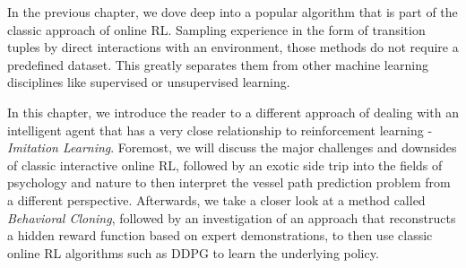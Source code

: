 In the previous chapter, we dove deep into a popular algorithm that is part of the classic approach of online RL. Sampling experience in the form of transition tuples by direct interactions with an environment, those methods do not require a predefined dataset. This greatly separates them from other machine learning disciplines like supervised or unsupervised learning.
\par 
In this chapter, we introduce the reader to a different approach of dealing with an intelligent agent that has a very close relationship to reinforcement learning - \textit{Imitation Learning}. Foremost, we will discuss the major challenges and downsides of classic interactive online RL, followed by an exotic side trip into the fields of psychology and nature to then interpret the vessel path prediction problem from a different perspective. Afterwards, we take a closer look at a method called \textit{Behavioral Cloning}, followed by an investigation of an approach that reconstructs a hidden reward function based on expert demonstrations, to then use classic online RL algorithms such as DDPG to learn the underlying policy. 